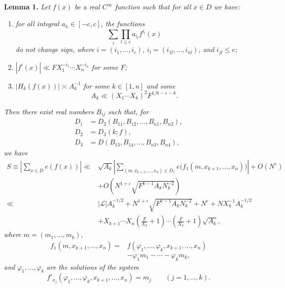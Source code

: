 \documentclass[10pt]{article}
\begin{document}
\medskip
\noindent\textbf{Lemma 1.}
\textit{Let $f(x)$ be a real $C^\infty$ function such that for all $x\in D$ we have:}
\begin{enumerate}
  \item[(i)] \textit{for all integral $a_{i_l}\in[-c,c]$, the functions
  \[
    \sum_i\prod_{l\leqslant c}a_{i_l}f^{i_l}(x)
  \]
  do not change sign, where $i=(i_1,\ldots,i_c)$, $i_l=(i_{1l},\ldots,i_{nl})$, and $i_{jl}\leqslant c$;}
  \item[(ii)] \textit{$|f^i(x)|\ll FX_1^{-i_1}\cdots X_n^{-i_n}$ for some $F$;}
  \item[(iii)] \textit{$|H_k(f(x))|\asymp A_k^{-1}$ for some $k\in[1,n]$ and some
  \[
    A_k\ll(X_1\cdots X_k)^2F^{1/6-\varepsilon-k}.
  \]}
\end{enumerate}
\textit{Then there exist real numbers $B_{ij}$ such that, for
\[
\begin{aligned}
  D_1&=D_2(B_{11},B_{12},\ldots,B_{n1},B_{n2}),\\
  D_2&=D_3(k;f),\\
  D_3&=D(B_{13},B_{14},\ldots,B_{n3},B_{n4}),
\end{aligned}
\]
we have}
\[
\begin{aligned}
S\equiv\left|\sum_{x\in D}e(f(x))\right|
\ll{}&\sqrt{A_k}\left|\sum_{(m,x_{k+1},\ldots,x_n)\in D_1}
 e\bigl(f_1(m,x_{k+1},\ldots,x_n)\bigr)\right|+O(N^\varepsilon)\\
&+O\left(N^{1+\varepsilon}\sqrt{F^{k-1}A_kN_k^{-2}}\right)\\
\ll{}&|\mathscr L|A_k^{-1/2}
 +N^{1+\varepsilon}\sqrt{F^{k-1}A_kN_k^{-2}}+N^\varepsilon
 +NX_k^{-1}A_k^{-1/2}\\
&+X_{k+1}\cdots X_n\left(\frac F{X_2}+1\right)\cdots
  \left(\frac F{X_k}+1\right)\sqrt{A_k},
\end{aligned}
\]
\textit{where $m=(m_1,\ldots,m_k)$,
\[
\begin{aligned}
f_1(m,x_{k+1},\ldots,x_n)
={}&f(\varphi_1,\ldots,\varphi_k,x_{k+1},\ldots,x_n)\\
&-\varphi_1m_1-\cdots-\varphi_km_k,
\end{aligned}
\]
and $\varphi_1,\ldots,\varphi_k$ are the solutions of the system
\[
  f'_{x_j}(\varphi_1,\ldots,\varphi_k,x_{k+1},\ldots,x_n)=m_j
  \qquad(j=1,\ldots,k).
\]}
\end{document}
